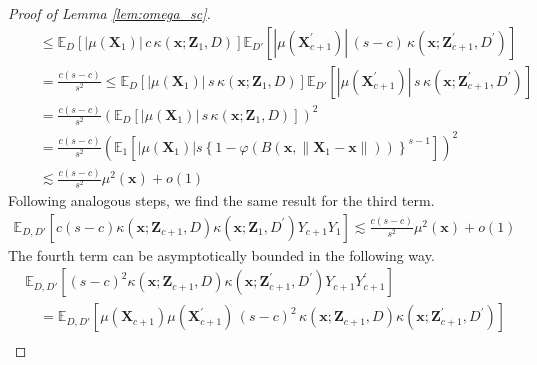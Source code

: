 \documentclass[letterpaper,10pt]{article}
\numberwithin{equation}{section}
\numberwithin{thm}{section}
\numberwithin{lem}{section}
\numberwithin{cor}{section}
\newcommand{\E}{\mathbb{E}}
\newcommand{\1}{\mathbbm{1}}
\begin{document}
\begin{proof}[Proof of Lemma \ref{lem:omega_sc}]
\begin{equation}
\begin{aligned}
			 & \quad \leq \E_{D}\left[|\mu(\mathbf{X}_1)| \, c \, \kappa\left(\mathbf{x}; \mathbf{Z}_{1}, D\right)\right]
			\E_{D'}\left[|\mu(\mathbf{X}_{c+1}^{\prime})| \, (s-c) \, \kappa\left(\mathbf{x}; \mathbf{Z}_{c+1}^{\prime}, D^{\prime}\right)\right]                                                                               \\
			 & \quad = \frac{c (s-c)}{s^2} \leq \E_{D}\left[|\mu(\mathbf{X}_1)| \, s \, \kappa\left(\mathbf{x}; \mathbf{Z}_{1}, D\right)\right]
			\E_{D'}\left[|\mu(\mathbf{X}_{c+1}^{\prime})| \, s \, \kappa\left(\mathbf{x}; \mathbf{Z}_{c+1}^{\prime}, D^{\prime}\right)\right]                                                                                   \\
			 & \quad = \frac{c (s-c)}{s^2} \left(\E_{D}\left[|\mu(\mathbf{X}_1)| \, s \, \kappa\left(\mathbf{x}; \mathbf{Z}_{1}, D\right)\right]\right)^2                                                                       \\
			 & \quad = \frac{c (s-c)}{s^2} \left(\E_{1}\left[|\mu(\mathbf{X}_1)| s\left\{1 - \varphi\left(B\left(\mathbf{x}, \|\mathbf{X}_1 - \mathbf{x}\|\right)\right)\right\}^{s-1}\right]\right)^2                          \\
			 & \quad \lesssim \frac{c(s-c)}{s^2}\mu^2(\mathbf{x}) + o(1)
		\end{aligned}
	\end{equation}
	Following analogous steps, we find the same result for the third term.
	\begin{equation}
		\begin{aligned}
			\E_{D, D'}\left[c(s-c) \kappa\left(\mathbf{x}; \mathbf{Z}_{c+1}, D\right)\kappa\left(\mathbf{x}; \mathbf{Z}_{1}, D^{\prime}\right)Y_{c+1}Y_{1}\right]
			\lesssim \frac{c(s-c)}{s^2}\mu^2(\mathbf{x}) + o(1)
		\end{aligned}
	\end{equation}
	The fourth term can be asymptotically bounded in the following way.
	\begin{equation}
		\begin{aligned}
			 & \E_{D, D'}\left[(s-c)^2 \kappa\left(\mathbf{x}; \mathbf{Z}_{c+1}, D\right)\kappa\left(\mathbf{x}; \mathbf{Z}_{c+1}^{\prime}, D^{\prime}\right)Y_{c+1}Y_{c+1}^{\prime}\right]                                           \\
			 & \quad = \E_{D, D'}\left[\mu(\mathbf{X}_{c+1})\mu(\mathbf{X}_{c+1}^{\prime})\, (s-c)^2 \, \kappa\left(\mathbf{x}; \mathbf{Z}_{c+1}, D\right)\kappa\left(\mathbf{x}; \mathbf{Z}_{c+1}^{\prime}, D^{\prime}\right)\right] \\

\end{aligned}
\end{equation}
\end{proof}
\end{document}
